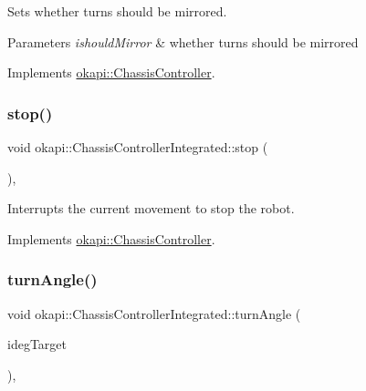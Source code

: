 Sets whether turns should be mirrored.


\begin{DoxyParams}{Parameters}
{\em ishould\+Mirror} & whether turns should be mirrored \\
\hline
\end{DoxyParams}


Implements \mbox{\hyperlink{classokapi_1_1ChassisController_a37ae36ec8936272eb31e3baed7eed417}{okapi\+::\+Chassis\+Controller}}.

\mbox{\label{classokapi_1_1ChassisControllerIntegrated_aab2f5d5cfb8ad96bd32be26a5a4e7113}} 
\subsubsection{\texorpdfstring{stop()}{stop()}}
{\footnotesize\ttfamily void okapi\+::\+Chassis\+Controller\+Integrated\+::stop (\begin{DoxyParamCaption}{ }\end{DoxyParamCaption})\hspace{0.3cm}{\ttfamily [override]}, {\ttfamily [virtual]}}

Interrupts the current movement to stop the robot. 

Implements \mbox{\hyperlink{classokapi_1_1ChassisController_ac67edbbbe1c8480c4503b9875a3719cd}{okapi\+::\+Chassis\+Controller}}.

\mbox{\label{classokapi_1_1ChassisControllerIntegrated_a3c2ae782167fd9c6b27d637563e3a066}} 
\subsubsection{\texorpdfstring{turnAngle()}{turnAngle()}\hspace{0.1cm}{\footnotesize\ttfamily [1/2]}}
{\footnotesize\ttfamily void okapi\+::\+Chassis\+Controller\+Integrated\+::turn\+Angle (\begin{DoxyParamCaption}\item[{Q\+Angle}]{ideg\+Target }\end{DoxyParamCaption})\hspace{0.3cm}{\ttfamily [override]}, {\ttfamily [virtual]}}

